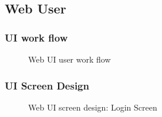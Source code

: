 
\topmargin=-0.45in
\evensidemargin=0in
\oddsidemargin=0in
\textwidth=6.5in
\textheight=9.0in
\headsep=0.25in

\linespread{1.1} %

\subsection{Web User}

\subsubsection{UI work flow}

\begin{figure}[H]
\centering	
{}
\caption{Web UI user work flow}
\end{figure}

\subsubsection{UI Screen Design}

\begin{figure}[H]
\centering	
{}
\caption{Web UI screen design: Login Screen}
\end{figure}

